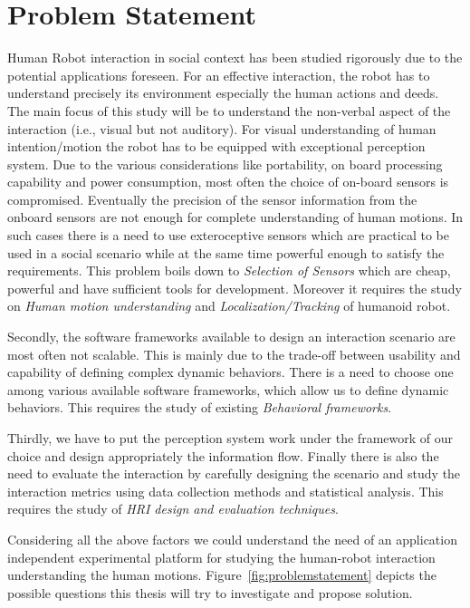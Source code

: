 \section{Problem Statement}
	Human Robot interaction in social context has been studied rigorously due to the potential applications foreseen. For an effective interaction, the robot has to understand precisely its environment especially the human actions and deeds. The main focus of this study will be to understand the non-verbal aspect of the interaction (i.e., visual but not auditory). For visual understanding of human intention/motion the robot has to be equipped with exceptional perception system. Due to the various considerations like portability, on board processing capability and power consumption, most often the choice of on-board sensors is compromised. Eventually the precision of the sensor information from the onboard sensors are not enough for complete understanding of human motions. In such cases there is a need to use exteroceptive sensors which are practical to be used in a social scenario while at the same time powerful enough to satisfy the requirements. This problem boils down to \emph{Selection of Sensors} which are cheap, powerful and have sufficient tools for development. Moreover it requires the study on \emph{Human motion understanding} and \emph{Localization/Tracking} of humanoid robot.
	
	Secondly, the software frameworks available to design an interaction scenario are most often not scalable. This is mainly due to the trade-off between usability and capability of defining complex dynamic behaviors. There is a need to choose one among various available software frameworks, which allow us to define dynamic behaviors. This requires the study of existing \emph{Behavioral frameworks}.

	Thirdly, we have to put the perception system work under the framework of our choice and design appropriately the information flow. Finally there is also the need to evaluate the interaction by carefully designing the scenario and study the interaction metrics using data collection methods and statistical analysis. This requires the study of \emph{HRI design and evaluation techniques}.

	Considering all the above factors we could understand the need of an application independent experimental platform for studying the human-robot interaction understanding the human motions. Figure~\ref{fig:problemstatement} depicts the possible questions this thesis will try to investigate and propose solution. 

